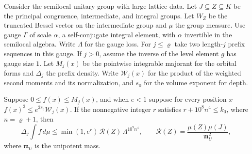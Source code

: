 \begin{lemma}
\label{lem:b-dyadic-shells}
\emitthmsource
Consider the semilocal unitary group with large lattice data. Let $J\subseteq Z\subseteq K$ be the principal congruence, 
intermediate, and integral groups. Let $W_Z$ be the truncated Bessel vector on the intermediate group and $\mu$ the group measure.
Use gauge $\Gamma$ of scale $\alpha$, a self-conjugate integral element, with $\alpha$ invertible in the semilocal algebra.
Write $\Lambda$ for the gauge loss. For $j\le\varrho$ take two length-$j$ prefix sequences in this gauge.
If $j>0$, assume the inverse of the level element $g$ has gauge size $1$.
Let $M_j(x)$ be the pointwise integrable majorant for the orbital forms and $\Delta_j$ the prefix density.
Write $\mathcal W_j(x)$ for the product of the weighted second moments and its normalization,
and $s_0$ for the volume exponent for depth.

Suppose $0\le f(x)\le M_j(x)$, and when $e<1$ suppose for every position $x$
$f(x)^2\le e^{2s_0}\mathcal W_j(x)$.
If the nonnegative integer $r$ satisfies $r+10^8 n^4\le k_0$, where $n=\varrho+1$, then
\[
 \Delta_j\int f\,d\mu
 \le \min(1,e^r)\,\mathcal R(Z)\,\Lambda^{10^9 n^4},
 \qquad
 \mathcal R(Z)=\frac{\mu(Z)\mu(J)}{\mathfrak m_U^2},
\]
where $\mathfrak m_U$ is the unipotent mass.
\end{lemma}
